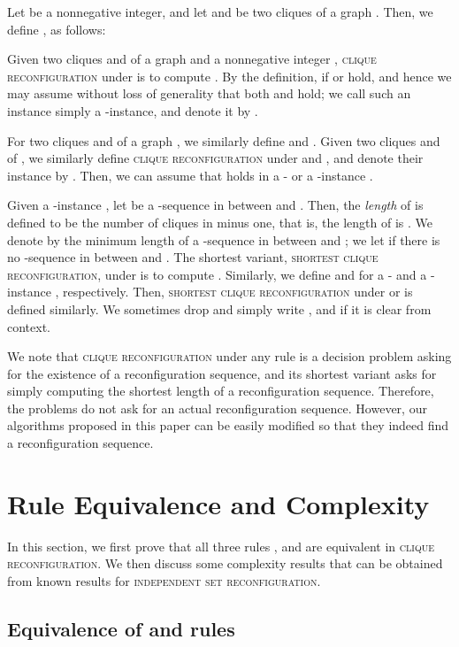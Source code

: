 \documentclass{llncs}
\newcounter{one}
\newcounter{two}
\newcounter{three}
\begin{document}
	Let  be a nonnegative integer, and let  and  be two cliques of a graph .
	Then, we define , as follows:
	
	Given two cliques  and  of a graph  and a nonnegative integer , \textsc{clique reconfiguration} under  is to compute .
	By the definition,  if  or  hold, and hence we may assume without loss of generality that both  and  hold;
we call such an instance simply a -instance, and denote it by .
	
	For two cliques  and  of a graph , we similarly define  and .
	Given two cliques  and  of , we similarly define \textsc{clique reconfiguration} under  and , and denote their instance by .
	Then, we can assume that  holds in a - or a -instance .

	Given a -instance , let  be a -sequence in  between  and . 
	Then, the \emph{length} of  is defined to be the number of cliques in  minus one, that is, the length of  is .
	We denote by  the minimum length of a -sequence in  between  and ;
we let  if there is no -sequence in  between  and . 
	The shortest variant, \textsc{shortest clique reconfiguration}, under  is to compute . 
	Similarly, we define  and  for a - and a -instance , respectively. 
	Then, \textsc{shortest clique reconfiguration} under  or  is defined similarly. 
	We sometimes drop  and simply write ,  and  if it is clear from context.
	
	We note that \textsc{clique reconfiguration} under any rule is a decision problem asking for the existence of a reconfiguration sequence, and its shortest variant asks for simply computing the shortest length of a reconfiguration sequence. 
	Therefore, the problems do not ask for an actual reconfiguration sequence. 
	However, our algorithms proposed in this paper can be easily modified so that they indeed find a reconfiguration sequence.  


\section{Rule Equivalence and Complexity}
\label{sec:rules}

In this section, we first prove that all three rules ,  and  are equivalent in \textsc{clique reconfiguration}.
We then discuss some complexity results that can be obtained from known results for \textsc{independent set reconfiguration}.
	

\subsection{Equivalence of  and  rules} 
\end{document}
